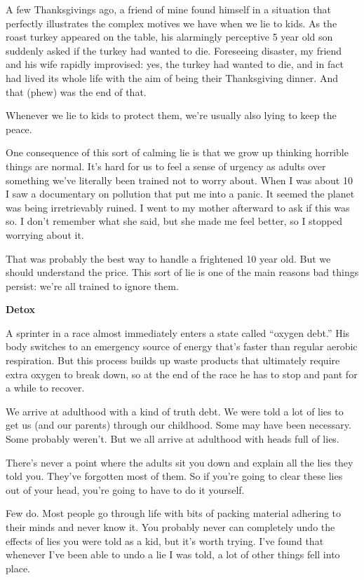 \documentclass[12pt]{book}
\begin{document}
A few Thanksgivings ago, a friend of mine found himself in a situation
that perfectly illustrates the complex motives we have when we lie to
kids. As the roast turkey appeared on the table, his alarmingly
perceptive 5 year old son suddenly asked if the turkey had wanted to
die. Foreseeing disaster, my friend and his wife rapidly improvised:
yes, the turkey had wanted to die, and in fact had lived its whole life
with the aim of being their Thanksgiving dinner. And that (phew) was the
end of that.

Whenever we lie to kids to protect them, we're usually also lying to
keep the peace.

One consequence of this sort of calming lie is that we grow up thinking
horrible things are normal. It's hard for us to feel a sense of urgency
as adults over something we've literally been trained not to worry
about. When I was about 10 I saw a documentary on pollution that put me
into a panic. It seemed the planet was being irretrievably ruined. I
went to my mother afterward to ask if this was so. I don't remember what
she said, but she made me feel better, so I stopped worrying about it.

That was probably the best way to handle a frightened 10 year old. But
we should understand the price. This sort of lie is one of the main
reasons bad things persist: we're all trained to ignore them.

\textbf{Detox}

A sprinter in a race almost immediately enters a state called ``oxygen
debt.'' His body switches to an emergency source of energy that's faster
than regular aerobic respiration. But this process builds up waste
products that ultimately require extra oxygen to break down, so at the
end of the race he has to stop and pant for a while to recover.

We arrive at adulthood with a kind of truth debt. We were told a lot of
lies to get us (and our parents) through our childhood. Some may have
been necessary. Some probably weren't. But we all arrive at adulthood
with heads full of lies.

There's never a point where the adults sit you down and explain all the
lies they told you. They've forgotten most of them. So if you're going
to clear these lies out of your head, you're going to have to do it
yourself.

Few do. Most people go through life with bits of packing material
adhering to their minds and never know it. You probably never can
completely undo the effects of lies you were told as a kid, but it's
worth trying. I've found that whenever I've been able to undo a lie I
was told, a lot of other things fell into place.
\end{document}
